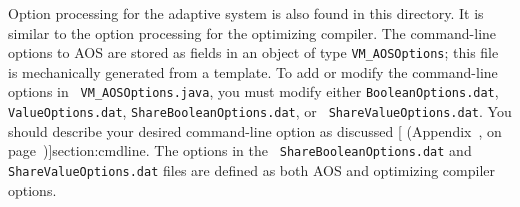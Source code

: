 %
%
%
%
Option processing for the adaptive system is also found in this
directory.  It is similar to the option processing for the optimizing
compiler.  The command-line options to AOS are
stored as fields in an object of type {\tt VM\_AOSOptions}; this file
is mechanically generated from a template.
To add or modify the command-line options in {\tt
VM\_AOSOptions.java}, you must modify either {\tt BooleanOptions.dat},
{\tt ValueOptions.dat}, {\tt ShareBooleanOptions.dat}, or {\tt
Share\-Val\-ue\-Op\-tions\-.dat}.  You should describe your desired command-line
option as discussed [ (Appendix~\Ref, on page~\Pageref)]{section:cmdline}.  The options in the {\tt
ShareBooleanOptions.dat} and {\tt ShareValueOptions.dat} files are
defined as both AOS and optimizing compiler options.


